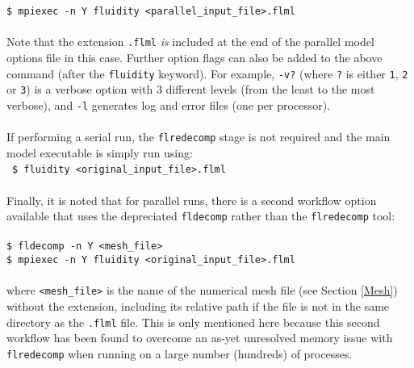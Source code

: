 \documentclass[10pt,a4paper]{article}
\newcommand\tab[1][0.5cm]{\hspace*{#1}}
\begin{document}
\tab \texttt{\$ mpiexec -n Y fluidity <parallel\_input\_file>.flml}\\\\
Note that the extension \texttt{.flml} \textit{is} included at the end of the parallel model options file in this case. Further option flags can also be added to the above command (after the \texttt{fluidity} keyword). For example, \texttt{-v?} (where \texttt{?} is either \texttt{1}, \texttt{2} or \texttt{3}) is a verbose option with 3 different levels (from the least to the most verbose), and \texttt{-l} generates log and error files (one per processor).\\\\
If performing a serial run, the \texttt{flredecomp} stage is not required and the main model executable is simply run using:\\\
\tab \texttt{\$ fluidity <original\_input\_file>.flml}\\\\
Finally, it is noted that for parallel runs, there is a second workflow option available that uses the depreciated \texttt{fldecomp} rather than the \texttt{flredecomp} tool:\\\\
\tab \texttt{\$ fldecomp -n Y <mesh\_file>}\\
\tab \texttt{\$ mpiexec -n Y fluidity <original\_input\_file>.flml}\\\\
where \texttt{<mesh\_file>} is the name of the numerical mesh file (see Section \ref{Mesh}) without the extension, including its relative path if the file is not in the same directory as the \texttt{.flml} file. This is only mentioned here because this second workflow has been found to overcome an as-yet unresolved memory issue with \texttt{flredecomp} when running on a large number (hundreds) of processes.
\end{document}
